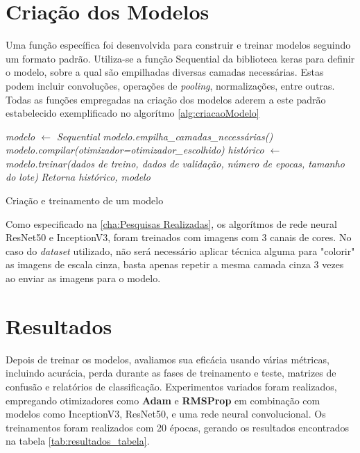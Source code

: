 \section{Criação dos Modelos}

Uma função específica foi desenvolvida para construir e treinar modelos seguindo um formato padrão. Utiliza-se a função Sequential da biblioteca keras para definir o modelo, sobre a qual são empilhadas diversas camadas necessárias. Estas podem incluir convoluções, operações de \textit{pooling}, normalizações, entre outras. Todas as funções empregadas na criação dos modelos aderem a este padrão estabelecido exemplificado no algorítmo \ref{alg:criacaoModelo}


\begin{algorithm}
\DontPrintSemicolon
{}
\BlankLine
\emph{modelo $\xleftarrow{}$ Sequential}\;
\emph{modelo.empilha\_camadas\_necessárias()}\;
\emph{modelo.compilar(otimizador=otimizador\_escolhido)}\;
\emph{histórico $\xleftarrow{}$ modelo.treinar(dados de treino, dados de validação, número de epocas, tamanho do lote)}\;
\emph{Retorna histórico, modelo}
\caption{Criação e treinamento de um modelo}\label{alg:criacaoModelo}
\end{algorithm}\DecMargin{1em}

Como especificado na \ref{cha:Pesquisas Realizadas}, os algorítmos de rede neural ResNet50 e InceptionV3, foram treinados com imagens com 3 canais de cores. No caso do \textit{dataset} utilizado, não será necessário aplicar técnica alguma para "colorir" as imagens de escala cinza, basta apenas repetir a mesma camada cinza 3 vezes ao enviar as imagens para o modelo. 


\section{Resultados}

Depois de treinar os modelos, avaliamos sua eficácia usando várias métricas, incluindo acurácia, perda durante as fases de treinamento e teste, matrizes de confusão e relatórios de classificação. Experimentos variados foram realizados, empregando otimizadores como \textbf{Adam} e \textbf{RMSProp} em combinação com modelos como InceptionV3, ResNet50, e uma rede neural convolucional. Os treinamentos foram realizados com 20 épocas, gerando os resultados encontrados na tabela \ref{tab:resultados_tabela}.
\newpage

